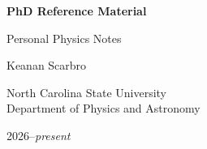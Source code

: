 \begin{titlepage}

\centering

\vspace*{2cm}

{\Huge\bfseries PhD Reference Material\par}

\vspace{1cm}

{\Large Personal Physics Notes\par}

\vspace{2cm}

{\large Keanan Scarbro\par}

\vfill

{\large
North Carolina State University\\
Department of Physics and Astronomy
\par}

\vspace{1cm}

{\large
2026--\textit{present}
\par}

\end{titlepage}